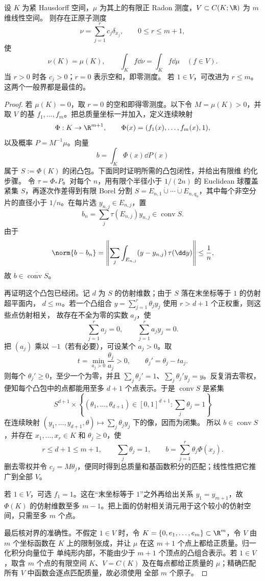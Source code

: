 \begin{proposition}\label{proposition:7-4-2-4}
设 $K$ 为紧 Hausdorff 空间，$\mu$ 为其上的有限正 Radon 测度，$V\subset C(K;\R)$ 为 $m$ 维线性空间。
则存在正原子测度
\[
 \nu=\sum_{j=1}^rc_j\delta_{x_j},\qquad
 0\leq r\leq m+1,
\]
使
\[
 \nu(K)=\mu(K),\qquad
 \int_Kf\dd\nu=\int_Kf\dd\mu\quad(f\in V).
\]
当 $r>0$ 时各 $c_j>0$；$r=0$ 表示空和，即零测度。
若 $1\in V$，可改进为 $r\le m$。这两个一般界都是最佳的。
\end{proposition}

\begin{proof}
若 $\mu(K)=0$，取 $r=0$ 的空和即得零测度。以下令 $M=\mu(K)>0$，并取 $V$ 的基
$f_1,\ldots,f_m$。把总质量坐标一并加入，定义连续映射
\[
 \Phi:K\to\R^{m+1},\qquad
 \Phi(x)=(f_1(x),\ldots,f_m(x),1),
\]
以及概率 $P=M^{-1}\mu$。向量
\[
 b=\int_K\Phi(x)\dd P(x)
\]
属于 $S:=\Phi(K)$ 的闭凸包。下面同时证明所需的凸包闭性，并给出有限维 \Caratheodory{} 约化步骤。
令 $\tau=\Phi_*P$。对每个 $n$，用有限个半径小于 $1/(2n)$ 的 Euclidean 球覆盖
紧集 $S$，再逐次作差得到有限 Borel 分割
$S=E_{n,1}\dot\cup\cdots\dot\cup E_{n,q_n}$，其中每个非空分片的直径小于 $1/n$。在每片选
$y_{n,j}\in E_{n,j}$，置
\[
 b_n=\sum_j\tau(E_{n,j})y_{n,j}\in\operatorname{conv}S.
\]
由于
\[
 \norm{b-b_n}
 =\left\|\sum_j\int_{E_{n,j}}(y-y_{n,j})\,\tau(\dd y)\right\|
 \leq\frac1n,
\]
故 $b\in\overline{\operatorname{conv}S}$。

再证明这个凸包已经闭。记 $d$ 为 $S$ 的仿射维数；由于 $S$ 落在末坐标等于 $1$ 的仿射超平面内，
$d\leq m$。若一个凸组合 $y=\sum_{j=1}^r\theta_jy_j$ 使用 $r>d+1$ 个正权重，则这些点仿射相关，
故存在不全为零的实数 $a_j$，使
\[
 \sum_{j=1}^ra_j=0,
 \qquad
 \sum_{j=1}^ra_jy_j=0.
\]
把 $(a_j)$ 乘以 $-1$（若有必要），可设某个 $a_j>0$。取
\[
 t=\min_{a_j>0}\frac{\theta_j}{a_j}>0,
 \qquad \theta_j'=\theta_j-ta_j.
\]
则每个 $\theta_j'\geq0$，至少一个为零，并且
$\sum_j\theta_j'=1$、$\sum_j\theta_j'y_j=y$。反复消去零权，便知每个凸包中的点都能用至多
$d+1$ 个点表示。于是 $\operatorname{conv}S$ 是紧集
\[
 S^{d+1}\times
 \left\{(\theta_1,\ldots,\theta_{d+1})\in[0,1]^{d+1}:\sum_j\theta_j=1\right\}
\]
在连续映射 $(y_1,\ldots,y_{d+1},\theta)\mapsto\sum_j\theta_jy_j$ 下的像，因而为闭集。
所以 $b\in\operatorname{conv}S$，并存在 $x_1,\ldots,x_r\in K$ 和 $\theta_j\geq0$，使
\[
 r\leq d+1\leq m+1,\qquad \sum_j\theta_j=1,\qquad
 b=\sum_{j=1}^r\theta_j\Phi(x_j).
\]
删去零权并令 $c_j=M\theta_j$，便同时得到总质量和基函数积分的匹配；线性性把它推广到全部 $V$。

若 $1\in V$，可选 $f_1=1$。这在“末坐标等于 $1$”之外再给出关系 $y_1=y_{m+1}$，故
$\Phi(K)$ 的仿射维数至多 $m-1$。把上面的仿射相关消元用于这个较小的仿射空间，只需至多 $m$ 个点。

最后核对界的准确性。不假定 $1\in V$ 时，令 $K=\{0,e_1,\ldots,e_m\}\subset\R^m$，令 $V$ 由
$m$ 个坐标函数在 $K$ 上的限制张成，并让 $\mu$ 在这 $m+1$ 个点上都给正质量。归一化积分向量位于
单纯形内部，不能由少于 $m+1$ 个顶点的凸组合表示。若 $1\in V$，取含 $m$ 个点的有限空间
$K$、$V=C(K)$ 及在每点都给正质量的 $\mu$；精确匹配所有 $V$ 中函数会逐点匹配质量，故必须使用
全部 $m$ 个原子。
\end{proof}


